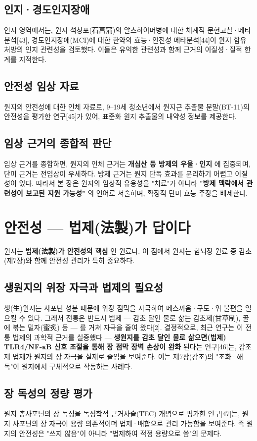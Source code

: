 \documentclass[11pt,oneside]{book}
\begin{document}
\subsection{인지·경도인지장애}
인지 영역에서는, 원지-석창포(石菖蒲)의 알츠하이머병에 대한 체계적 문헌고찰·메타분석[43], 경도인지장애(MCI)에 대한 한약의 효능·안전성 메타분석[44]이 원지 함유 처방의 인지 관련성을 검토했다. 이들은 유익한 관련성과 함께 근거의 이질성·질적 한계를 지적한다.

\subsection{안전성 임상 자료}
원지의 안전성에 대한 인체 자료로, 9–19세 청소년에서 원지근 추출물 분말(BT-11)의 안전성을 평가한 연구[45]가 있어, 표준화 원지 추출물의 내약성 정보를 제공한다.

\subsection{임상 근거의 종합적 판단}
임상 근거를 종합하면, 원지의 인체 근거는 \textbf{개심산 등 방제의 우울·인지} 에 집중되며, 단미 근거는 전임상이 우세하다. 방제 근거는 원지 단독 효과를 분리하기 어렵고 이질성이 있다. 따라서 본 장은 원지의 임상적 유용성을 "치료"가 아니라 \textbf{"방제 맥락에서 관련성이 보고된 지원 가능성"} 의 언어로 서술하며, 확정적 단미 효능 주장을 배제한다.

\section{안전성 — 법제(法製)가 답이다}
원지는 \textbf{법제(法製)가 안전성의 핵심} 인 원료다. 이 점에서 원지는 힘뇌장 원료 중 감초(제7장)와 함께 안전성 관리가 특히 중요하다.

\subsection{생원지의 위장 자극과 법제의 필요성}
생(生)원지는 사포닌 성분 때문에 위장 점막을 자극하여 메스꺼움·구토·위 불편을 일으킬 수 있다. 그래서 전통은 반드시 법제 — 감초 달인 물로 삶는 감초제(甘草制), 꿀에 볶는 밀자(蜜炙) 등 — 를 거쳐 자극을 줄여 왔다[2]. 결정적으로, 최근 연구는 이 전통 법제의 과학적 근거를 실증했다 — \textbf{생원지를 감초 달인 물로 삶으면(법제) TLR4/NF-κB 신호 조절을 통해 장 점막 장벽 손상이 완화} 된다는 연구[46]는, 감초제 법제가 원지의 장 자극을 실제로 줄임을 보여준다. 이는 제7장(감초)의 "조화·해독"이 원지에서 구체적으로 작동하는 사례다.

\subsection{장 독성의 정량 평가}
원지 총사포닌의 장 독성을 독성학적 근거사슬(TEC) 개념으로 평가한 연구[47]는, 원지 사포닌의 장 자극이 용량 의존적이며 법제·배합으로 관리 가능함을 보여준다. 즉 원지의 안전성은 "쓰지 않음"이 아니라 "법제하여 적정 용량으로 씀"의 문제다.
\end{document}

